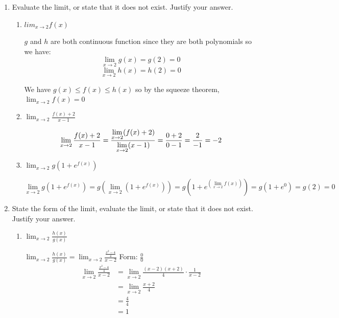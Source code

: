 \documentclass[nooutcomes]{ximera}
\begin{document}
\begin{problem}
\begin{enumerate}
	\item	Evaluate the limit, or state that it does not exist.  Justify your answer.
		\begin{enumerate}
		\item $lim_{x \to 2} f(x)$
			\begin{freeResponse}
		$g$ and $h$ are both continuous function since they are both polynomials so we have:
		\[
		\lim_{x \to 2} g(x)=g(2)=0
		\]
		\[
		\lim_{x \to 2} h(x)=h(2)=0
		\]

		We have $g(x) \le f(x) \le h(x)$ so by the squeeze theorem, $\lim_{x \to 2} f(x)=0$
			\end{freeResponse}

		\item $\lim_{x \to 2} \frac{f(x)+2}{x-1}$
			\begin{freeResponse}
			\[
			\lim_{x \to 2}\frac{f(x)+2}{x-1}=\frac{\lim_{x \to 2}(f(x)+2)}{\lim_{x \to 2}(x-1)}\\
			= \frac{0+2}{0-1}\\
			= \frac{2}{-1}\\
			= -2
			\]
			\end{freeResponse}
		\item $\lim_{x \to 2} g(1+e^{f(x)})$
			\begin{freeResponse}
			\[
			\lim_{x \to 2} g(1+e^{f(x)})= g (\lim_{x \to 2} (1+e^{f(x)}))
			=g (1+e^{(\lim_{x \to 2}f(x))})
			=g(1+e^0)=g(2)=0
			\]
			\end{freeResponse}

		\end{enumerate}
	\item State the form of the limit, evaluate the limit, or state that it does not exist.  Justify your answer.
		\begin{enumerate}
		
		
		\item $\lim_{x \to 2}\frac{h(x)}{g(x)}$

		\begin{freeResponse}
			$\lim_{x \to 2}\frac{h(x)}{g(x)}=\lim_{x \to 2}\frac{\frac{x^2-4}{4}}{x-2}$
		Form: $\frac{{0}}{0}$ \\
		\begin{align*}
		\lim_{x \to 2}\frac{\frac{x^2-4}{4}}{x-2}&=\lim_{x \to 2}\frac{(x-2)(x+2)}{4}\cdot \frac{1}{x-2}\\
		&= \lim_{x \to 2} \frac{x+2}{4}\\
		&= \frac{4}{4}\\
		&= 1
		\end{align*}
		\end{freeResponse}	


\end{enumerate}
\end{enumerate}
\end{problem}
\end{document}
